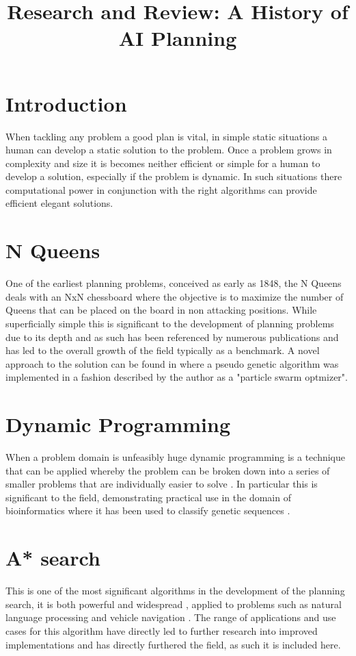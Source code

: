 \documentclass[11pt]{article}
\title{\textbf{Research and Review: A History of AI Planning}}
\begin{document}
\maketitle

\newpage

\section{Introduction}
When tackling any problem a good plan is vital, in simple static situations a human can develop a static solution to the problem. Once a problem grows in complexity and size it is becomes neither efficient or simple for a human to develop a solution, especially if the problem is dynamic. In such situations there computational power in conjunction with the right algorithms can provide efficient elegant solutions. 

\section{N Queens}
One of the earliest planning problems, conceived as early as 1848\cite{russell2005ai}, the N Queens deals with an NxN chessboard where the objective is to maximize the number of Queens that can be placed on the board in non attacking positions. While superficially simple this is significant to the development of planning problems due to its depth and as such has been referenced by numerous publications \cite{russell2005ai, hu2003swarm, bell2009survey, singhcomparative} and has led to the overall growth of the field typically as a benchmark. A novel approach to the solution can be found in \cite{hu2003swarm} where a pseudo genetic algorithm was implemented in a fashion described by the author as a "particle swarm optmizer".

\section{Dynamic Programming}
When a problem domain is unfeasibly huge dynamic programming is a technique that can be applied whereby the problem can be broken down into a series of smaller problems that are individually easier to solve \cite{bertsekas1995dynamic}. In particular this is significant to the field, demonstrating practical use in the domain of bioinformatics where it has been used to classify genetic sequences \cite{snyder1993identification}.

\section{A* search}
This is one of the most significant algorithms in the development of the planning search, it is both powerful and widespread \cite{alshawi2012lifetime, russell2005ai, klein2003parsing}, applied to problems such as natural language processing \cite{klein2003parsing} and vehicle navigation \cite{bell2009hyperstar}. The range of applications and use cases for this algorithm have directly led to further research into improved implementations and has directly furthered the field, as such it is included here.



\end{document}
